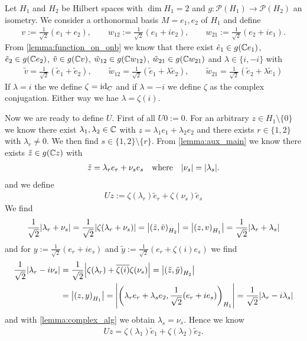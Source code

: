 \begin{example} \label{example:twodim}
	Let $H_1$ and $H_2$ be Hilbert spaces with $\dim H_1 = 2$ and $g: \mathcal{P}(H_1) \to \mathcal{P}(H_2)$ an isometry. We consider a orthonormal basis $M = {e_1, e_2}$ of $H_1$ and define
	\begin{align*}
		v := \frac{1}{\sqrt{2}}(e_1 + e_2), \qquad w_{12} := \frac{1}{\sqrt{2}}(e_1 + i e_2), \qquad  w_{21} := \frac{1}{\sqrt{2}}(e_2 + i e_1).
	\end{align*} 
	From \ref{lemma:function_on_onb} we know that there exist $\tilde{e}_1 \in g(\mathbb{C} e_1)$, $\tilde{e}_2 \in g(\mathbb{C} e_2)$, $\tilde{v} \in g(\mathbb{C} v)$, $\tilde{w}_{12} \in g(\mathbb{C} w_{12})$, $\tilde{w}_{21} \in g(\mathbb{C} w_{21})$ and $\lambda \in \{i, -i\}$ with
	\begin{align*}
		\tilde{v} = \frac{1}{\sqrt{2}}(\tilde{e}_1 + \tilde{e}_2), \qquad \tilde{w}_{12} = \frac{1}{\sqrt{2}}(\tilde{e}_1 + \lambda \tilde{e}_2), \qquad \tilde{w}_{21} = \frac{1}{\sqrt{2}}(\tilde{e}_2 + \lambda \tilde{e}_1)
	\end{align*} 
	If $\lambda = i$ the we define $\zeta = \operatorname{id}_C$ and if $\lambda = -i$ we define $\zeta$ as the complex conjugation. Either way we hae $\lambda = \zeta(i)$.
	
	Now we are ready to define $U$. First of all $U0 := 0$. For an arbitrary $z \in H_1 \setminus \{0\}$ we know there exist $\lambda_1, \lambda_2 \in \mathbb{C}$ with $z = \lambda_1 e_1 + \lambda_2 e_2$ and there exists $r \in \{1,2\}$ with $\lambda_r \neq 0$. We then find $s \in \{1, 2\} \setminus \{r\}$. From \ref{lemma:aux_main} we know there exists $\tilde{z} \in g(\mathbb{C} z)$ with 
	\begin{align*}
		\tilde{z} = \lambda_r e_r + \nu_s e_s \quad \text{where} \quad {\left | \nu_s \right |} = {\left | \lambda_s \right |}.
	\end{align*}
	and we define
	\begin{align*}
		Uz := \zeta(\lambda_r) \tilde{e}_r + \zeta(\nu_s) \tilde{e}_s
	\end{align*}
	We find 
	\begin{align*}
		\frac{1}{\sqrt{2}} {\left | \lambda_r + \nu_s \right |} = \frac{1}{\sqrt{2}} {\left | \zeta(\lambda_r + \nu_s) \right |}= {\left | {\left ( \tilde{z}, \tilde{v} \right )}_{H_2} \right |} = {\left | {\left ( z, v \right )}_{H_1} \right |} = \frac{1}{\sqrt{2}} {\left | \lambda_r + \lambda_s \right |}
	\end{align*}
	and for $y := \frac{1}{\sqrt{2}}(e_r + ie_s)$ and $\tilde{y} := \frac{1}{\sqrt{2}} (e_r + \zeta(i) e_s)$ we find
	\begin{align*}
		\frac{1}{\sqrt{2}}{\left | \lambda_r - i\nu_s \right |} &= \frac{1}{\sqrt{2}} {\left | \zeta(\lambda_r) + \overline{\zeta(i)} \zeta(\nu_s) \right |}= {\left | {\left ( \tilde{z}, \tilde{y} \right )}_{H_2} \right |} \\
		&= {\left | {\left ( z, y \right )}_{H_1} \right |} = {\left | {\left ( \lambda_r e_r + \lambda_s e_2, \frac{1}{\sqrt{2}}(e_r + ie_s) \right )}_{H_1} \right |} = \frac{1}{\sqrt{2}} {\left | \lambda_r - i\lambda_s \right |}
	\end{align*}
	and with \ref{lemma:complex_alg} we obtain $\lambda_s = \nu_s$. Hence we know
	\begin{align*}
		Uz = \zeta(\lambda_1) \tilde{e}_1 + \zeta(\lambda_2) \tilde{e}_2.
	\end{align*}
	

\end{example}
